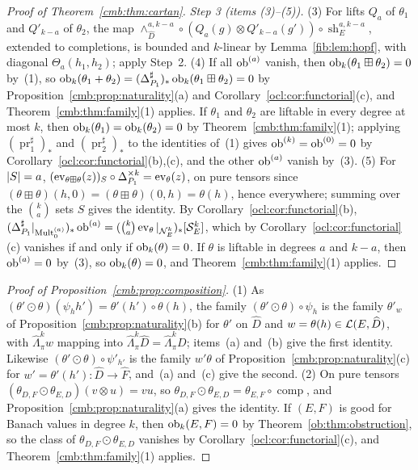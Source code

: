 \begin{proof}[Proof of Theorem~\ref{cmb:thm:cartan}]
\emph{Step 3 (items (3)--(5)).} (3) For lifts $Q_a$ of $\theta_1$ and $Q'_{k-a}$ of $\theta_2$, the map
$\wedge^{a,k-a}_{\widehat D}\circ(Q_a(g)\otimes Q'_{k-a}(g'))\circ\operatorname{sh}^{a,k-a}_E$, extended to completions,
is bounded and $k$-linear by Lemma~\ref{fib:lem:hopf}, with diagonal $\Theta_a(h_1,h_2)$; apply Step~2. (4) If all
$\operatorname{ob}^{(a)}$ vanish, then $\operatorname{ob}_k(\theta_1\boxplus\theta_2)=0$ by~(1), so
$\operatorname{ob}_k(\theta_1+\theta_2)=(\Delta_{P_1}^\sharp)_*\operatorname{ob}_k(\theta_1\boxplus\theta_2)=0$ by
Proposition~\ref{cmb:prop:naturality}(a) and Corollary~\ref{ocl:cor:functorial}(c), and Theorem~\ref{cmb:thm:family}(1)
applies. If $\theta_1$ and $\theta_2$ are liftable in every degree at most $k$, then
$\operatorname{ob}_k(\theta_1)=\operatorname{ob}_k(\theta_2)=0$ by Theorem~\ref{cmb:thm:family}(1); applying $(\operatorname{pr}_1^\sharp)_*$
and $(\operatorname{pr}_2^\sharp)_*$ to the identities of~(1) gives $\operatorname{ob}^{(k)}=\operatorname{ob}^{(0)}=0$ by
Corollary~\ref{ocl:cor:functorial}(b),(c), and the other $\operatorname{ob}^{(a)}$ vanish by~(3). (5) For $\lvert S\rvert=a$,
$(\operatorname{ev}_{\theta\boxplus\theta}(z))_S\circ\Delta_{P_1}^{\times k}=\operatorname{ev}_\theta(z)$, on pure tensors since
$(\theta\boxplus\theta)(h,0)=(\theta\boxplus\theta)(0,h)=\theta(h)$, hence everywhere; summing over the $\binom ka$ sets
$S$ gives the identity. By Corollary~\ref{ocl:cor:functorial}(b),
$(\Delta_{P_1}^\sharp|_{\operatorname{Mult}^{(a)}_0})_*\operatorname{ob}^{(a)}=(\binom ka\operatorname{ev}_\theta|_{\mathcal N^k_E})_*[\mathcal S^k_E]$, which by
Corollary~\ref{ocl:cor:functorial}(c) vanishes if and only if $\operatorname{ob}_k(\theta)=0$. If $\theta$ is liftable in degrees $a$
and $k-a$, then $\operatorname{ob}^{(a)}=0$ by~(3), so $\operatorname{ob}_k(\theta)=0$, and Theorem~\ref{cmb:thm:family}(1) applies.
\end{proof}

\begin{proof}[Proof of Proposition~\ref{cmb:prop:composition}]
(1) As $(\theta'\odot\theta)(\psi_hh')=\theta'(h')\circ\theta(h)$, the family $(\theta'\odot\theta)\circ\psi_h$ is the
family $\theta'_w$ of Proposition~\ref{cmb:prop:naturality}(b) for $\theta'$ on $\widehat D$ and
$w=\theta(h)\in\mathcal L(E,\widehat D)$, with $\widehat\Lambda^k_\pi w$ mapping into $\widehat\Lambda^k_\pi\widehat
D=\widehat\Lambda^k_\pi D$; items~(a) and~(b) give the first identity. Likewise $(\theta'\odot\theta)\circ\psi'_{h'}$ is
the family $w'\theta$ of Proposition~\ref{cmb:prop:naturality}(c) for $w'=\theta'(h')\colon\widehat D\to\widehat F$,
and~(a) and~(c) give the second. (2) On pure tensors $(\theta_{D,F}\odot\theta_{E,D})(v\otimes u)=vu$, so
$\theta_{D,F}\odot\theta_{E,D}=\theta_{E,F}\circ\operatorname{comp}$, and Proposition~\ref{cmb:prop:naturality}(a)
gives the identity. If $(E,F)$ is good for Banach values in degree $k$, then $\operatorname{ob}_k(E,F)=0$ by
Theorem~\ref{ob:thm:obstruction}, so the class of $\theta_{D,F}\odot\theta_{E,D}$ vanishes by
Corollary~\ref{ocl:cor:functorial}(c), and Theorem~\ref{cmb:thm:family}(1) applies.
\end{proof}

